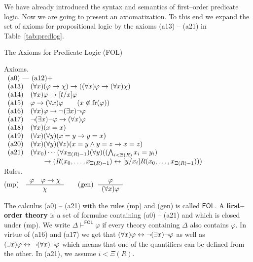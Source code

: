 We have already introduced the syntax and semantics of first--order
predicate logic. Now we are going to present an axiomatization. To
this end we expand the set of axioms for propositional logic by
the axioms (a13) -- (a21) in Table~\ref{tab:predlog}. 
\begin{table}
\caption{The Axioms for Predicate Logic (FOL)}
\label{tab:predlog}
\mbox{\sc Axioms.} \\[2mm]
$\begin{array}{ll}
\multicolumn{2}{l}{\mbox{\rm (a0) --- (a12)} +} \\
\mbox{\rm (a13)} & (\forall x)(\varphi\pf\chi)
    \pf ((\forall x)\varphi \pf (\forall x)\chi) \\
\mbox{\rm (a14)} & (\forall x)\varphi \pf [t/x]\varphi \\
\mbox{\rm (a15)} & \varphi \pf (\forall x)\varphi \qquad 
    (x\not\in \fr(\varphi)) \\
\mbox{\rm (a16)} & (\forall x)\varphi \pf
    \nicht (\exists x)\nicht \varphi \\
\mbox{\rm (a17)} & \nicht (\exists x)\nicht \varphi
    \pf (\forall x)\varphi \\
\mbox{\rm (a18)} & (\forall x)(x \doteq x) \\
\mbox{\rm (a19)} & (\forall x)(\forall y)(x \doteq y \pf y \doteq x) \\
\mbox{\rm (a20)} & (\forall x)(\forall y)(\forall z)(x \doteq y 
	\und y \doteq z \pf x \doteq z) \\
\mbox{\rm (a21)} & (\forall x_0)\dotsb (\forall x_{\Xi(R)-1})(\forall 
	y)((\gund_{i < \Xi(R)} x_i
\doteq y_i) \\
    & \qquad \pf  (R(x_0, \dotsc, x_{\Xi(R)-1})
    \dpf [y/x_i]R(x_0, \dotsc, x_{\Xi(R)-1})))
\end{array}$
\\[2mm]
\mbox{\sc Rules.}\\[2mm]
\mbox{\rm (mp)}~~$\begin{array}{c}
    \varphi \quad \varphi\rightarrow\chi \\\hline
    \chi
    \end{array}
    \qquad
  \mbox{\rm (gen)}~~\begin{array}{c}
    \varphi \\\hline
    (\forall x)\varphi
    \end{array}$
\end{table}
The calculus (a0) -- (a21) with the rules (mp) and (gen) is called 
$\mathsf{FOL}$. A \textbf{first--order theory} is a set of formulae 
containing (a0) -- (a21) and which is closed under (mp). 
We write $\Delta \vdash^{\mathsf{FOL}} \varphi$ if every theory 
containing $\Delta$ also contains $\varphi$.
In virtue of (a16) and (a17) we get that 
$(\forall x)\varphi \leftrightarrow \neg(\exists x)\neg\varphi$ as well as 
$(\exists x)\varphi \leftrightarrow \neg(\forall x)\neg\varphi$ which means 
that one of the quantifiers can be defined from the other. In (a21), 
we assume $i < \Xi(R)$. 

